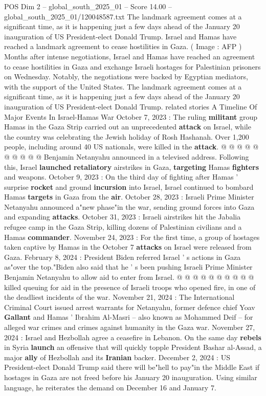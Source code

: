 \begin{textsample}{POS Dim 2 – global\_south\_2025\_01 – Score 14.00 – global\_south\_2025\_01/120048587.txt}  \label{ex:f2_pos_329}
The landmark agreement comes at a significant time, as it is happening just a few days ahead of the January 20 inauguration of US President-elect Donald Trump.
Israel and Hamas have reached a landmark agreement to cease hostilities in Gaza. ( Image : AFP ) Months after intense negotiations, Israel and Hamas have reached an agreement to cease hostilities in Gaza and exchange Israeli hostages for Palestinian prisoners on Wednesday.
Notably, the negotiations were backed by Egyptian mediators, with the support of the United States.
The landmark agreement comes at a significant time, as it is happening just a few days ahead of the January 20 inauguration of US President-elect Donald Trump. related stories A Timeline Of Major Events In Israel-Hamas War October 7, 2023 : The ruling \textbf{militant} group Hamas in the Gaza Strip carried out an unprecedented \textbf{attack} on Israel, while the country was celebrating the Jewish holiday of Rosh Hashanah.
Over 1,200 people, including around 40 US nationals, were killed in the \textbf{attack}. @ @ @ @ @ @ @ @ @ @ Benjamin Netanyahu announced in a televised address.
Following this, Israel \textbf{launched} \textbf{retaliatory} airstrikes in Gaza, \textbf{targeting} Hamas \textbf{fighters} and weapons.
October 9, 2023 : On the third day of fighting after Hamas ' surprise \textbf{rocket} and ground \textbf{incursion} into Israel, Israel continued to bombard Hamas \textbf{targets} in Gaza from the \textbf{air}.
October 28, 2023 : Israeli Prime Minister Netanyahu announced a"new phase"in the war, sending ground forces into Gaza and expanding \textbf{attacks}.
October 31, 2023 : Israeli airstrikes hit the Jabalia refugee camp in the Gaza Strip, killing dozens of Palestinian civilians and a Hamas \textbf{commander}.
November 24, 2023 : For the first time, a group of hostages taken captive by Hamas in the October 7 \textbf{attacks} on Israel were released from Gaza.
February 8, 2024 : President Biden referred Israel ' s actions in Gaza as"over the top."Biden also said that he ' s been pushing Israeli Prime Minister Benjamin Netanyahu to allow aid to enter from Israel. @ @ @ @ @ @ @ @ @ @ killed queuing for aid in the presence of Israeli troops who opened fire, in one of the deadliest incidents of the war.
November 21, 2024 : The International Criminal Court issued arrest warrants for Netanyahu, former defence chief Yoav \textbf{Gallant} and Hamas ' Ibrahim Al-Masri -- also known as Mohammed Deif -- for alleged war crimes and crimes against humanity in the Gaza war.
November 27, 2024 : Israel and Hezbollah agree a ceasefire in Lebanon.
On the same day \textbf{rebels} in Syria \textbf{launch} an offensive that will quickly topple President Bashar al-Assad, a major \textbf{ally} of Hezbollah and its \textbf{Iranian} backer.
December 2, 2024 : US President-elect Donald Trump said there will be"hell to pay"in the Middle East if hostages in Gaza are not freed before his January 20 inauguration.
Using similar language, he reiterates the demand on December 16 and January 7.

\end{textsample}
